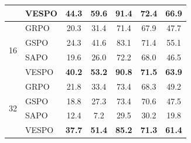 \documentclass{article}
\theoremstyle{plain}
\theoremstyle{definition}
\theoremstyle{remark}
\begin{document}
\begin{table}[t]
\begin{small}
\begin{tabular}{@{}c|l|ccccc@{}}
          & \cellcolor{ourhighlight}VESPO & \cellcolor{ourhighlight}\textbf{44.3} & \cellcolor{ourhighlight}\textbf{59.6} & \cellcolor{ourhighlight}\textbf{91.4} & \cellcolor{ourhighlight}\textbf{72.4} & \cellcolor{ourhighlight}\textbf{66.9} \\
      \midrule
      \multirow{4}{*}{16}
          & GRPO                          & 20.3                                  & 31.4                                  & 71.4                                  & 67.9                                  & 47.7                                  \\
          & GSPO                          & 24.3                                  & 41.6                                  & 83.1                                  & 71.4                                  & 55.1                                  \\
          & SAPO                          & 19.6                                  & 26.0                                  & 72.2                                  & 68.0                                  & 46.5                                  \\
          & \cellcolor{ourhighlight}VESPO & \cellcolor{ourhighlight}\textbf{40.2} & \cellcolor{ourhighlight}\textbf{53.2} & \cellcolor{ourhighlight}\textbf{90.8} & \cellcolor{ourhighlight}\textbf{71.5} & \cellcolor{ourhighlight}\textbf{63.9} \\
      \midrule
      \multirow{4}{*}{32}
          & GRPO                          & 21.8                                  & 33.4                                  & 73.4                                  & 68.3                                  & 49.2                                  \\
          & GSPO                          & 18.8                                  & 27.3                                  & 73.4                                  & {70.6}                                & 47.5                                  \\
          & SAPO                          & 12.4                                  & 7.2                                   & 29.5                                  & 30.2                                  & 19.8                                  \\
          & \cellcolor{ourhighlight}VESPO & \cellcolor{ourhighlight}\textbf{37.7} & \cellcolor{ourhighlight}\textbf{51.4} & \cellcolor{ourhighlight}\textbf{85.2} & \cellcolor{ourhighlight}\textbf{71.3} & \cellcolor{ourhighlight}\textbf{61.4} \\

\end{tabular}
\end{small}
\end{table}
\end{document}

